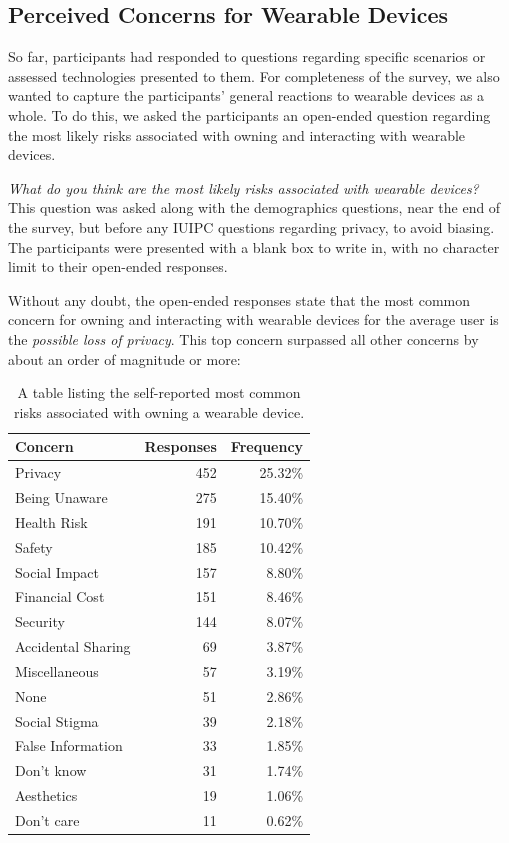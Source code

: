 \documentclass{acm_proc_article-sp}
\begin{document}
\subsection{Perceived Concerns for Wearable Devices}
So far, participants had responded to questions regarding specific scenarios or assessed technologies presented to them. For completeness of the survey, we also wanted to capture the participants' general reactions to wearable devices as a whole. To do this, we asked the participants an open-ended question regarding the most likely risks associated with owning and interacting with wearable devices.

\textit{What do you think are the most likely risks associated with wearable devices?}\\[-.5cm]

This question was asked along with the demographics questions, near the end of the survey, but before any IUIPC questions regarding privacy, to avoid biasing. The participants were presented with a blank box to write in, with no character limit to their open-ended responses. 

Without any doubt, the open-ended responses state that the most common concern for owning and interacting with wearable devices for the average user is the \textit{possible loss of privacy}. This top concern surpassed all other concerns by about an order of magnitude or more:

\begin{table}[h]
\begin{center}
\begin{tabular}{|l|r|r|}
\hline
Concern &  Responses &  Frequency   \\
\hline
Privacy & 452 & 25.32\% \\
Being Unaware & 275 & 15.40\% \\
Health Risk & 191 & 10.70\%\\
Safety & 185 & 10.42\%\\
Social Impact &	157 & 8.80\%\\
Financial Cost & 151 & 8.46\%\\
Security &	144 & 8.07\%\\
Accidental Sharing &	69 & 3.87\%\\
Miscellaneous &	57 & 3.19\%\\
None	& 51 & 2.86\%\\
Social Stigma &	39 & 2.18\%\\
False Information & 33 & 1.85\%\\
Don't know & 31 & 1.74\%\\
Aesthetics 	& 19 & 1.06\%\\
Don't care 	& 11 & 0.62\%\\
\hline
\end{tabular}
\caption{A table listing the self-reported most common risks associated with owning a wearable device.}
\label{open-responses}
\end{center}
\end{table}
\end{document}
